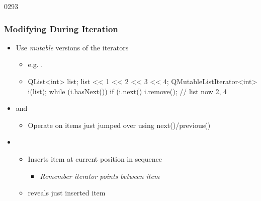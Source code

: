 \begin{slide}[fragile]{0293}\frametitle{Modifying During Iteration}
\begin{itemize}
  \item Use \emph{mutable} versions of the iterators
  \begin{itemize}
	  \item e.g. .
    \item[] \begin{cpp}
QList<int> list; 
list << 1 << 2 << 3 << 4;
QMutableListIterator<int> i(list);
while (i.hasNext()) {
  if (i.next() %
    i.remove();
}
// list now 2, 4  
    \end{cpp}
  \end{itemize}
  \item {} and 
  \begin{itemize}
    \item  Operate on items just jumped over using next()/previous()
  \end{itemize}
  \item {} 
  \begin{itemize}
    \item Inserts item at current position in sequence \\ 
    \begin{itemize}    
    	\item \emph{Remember iterator points between item}
    \end{itemize}    
    \item {} reveals just inserted item
  \end{itemize}
\end{itemize}    
\end{slide}

